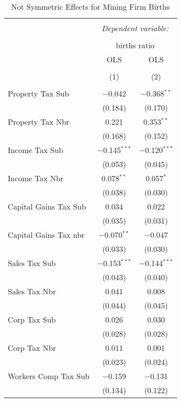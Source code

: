 
\begin{table}[!htbp] \centering 
  \caption{Not Symmetric Effects for  Mining Firm Births} 
  \label{21noequality} 
\begin{tabular}{@{\extracolsep{5pt}}lcc} 
\\[-1.8ex]\hline 
\hline \\[-1.8ex] 
 & \multicolumn{2}{c}{\textit{Dependent variable:}} \\ 
\cline{2-3} 
\\[-1.8ex] & \multicolumn{2}{c}{births ratio} \\ 
 & OLS & OLS \\ 
\\[-1.8ex] & (1) & (2)\\ 
\hline \\[-1.8ex] 
 Property Tax Sub & $-$0.042 & $-$0.368$^{**}$ \\ 
  & (0.184) & (0.170) \\ 
  Property Tax Nbr & 0.221 & 0.353$^{**}$ \\ 
  & (0.168) & (0.152) \\ 
  Income Tax Sub & $-$0.145$^{***}$ & $-$0.120$^{***}$ \\ 
  & (0.053) & (0.045) \\ 
  Income Tax Nbr & 0.078$^{**}$ & 0.057$^{*}$ \\ 
  & (0.038) & (0.030) \\ 
  Capital Gains Tax Sub & 0.034 & 0.022 \\ 
  & (0.035) & (0.031) \\ 
  Capital Gains Tax nbr & $-$0.070$^{**}$ & $-$0.047 \\ 
  & (0.033) & (0.030) \\ 
  Sales Tax Sub & $-$0.153$^{***}$ & $-$0.144$^{***}$ \\ 
  & (0.043) & (0.040) \\ 
  Sales Tax Nbr & 0.041 & 0.008 \\ 
  & (0.044) & (0.045) \\ 
  Corp Tax Sub & 0.026 & 0.030 \\ 
  & (0.028) & (0.028) \\ 
  Corp Tax Nbr & 0.011 & 0.001 \\ 
  & (0.023) & (0.024) \\ 
  Workers Comp Tax Sub & $-$0.159 & $-$0.131 \\ 
  & (0.134) & (0.122) \\ 

\end{tabular}
\end{table}
